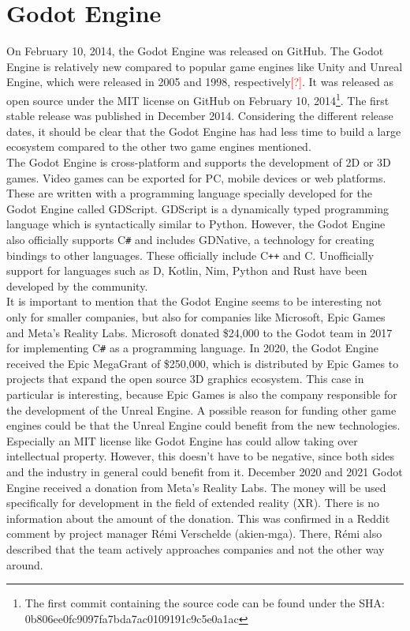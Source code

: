 \section{Godot Engine}
On February 10, 2014, the Godot Engine was released on GitHub.
The Godot Engine is relatively new compared to popular game engines like Unity and Unreal Engine, which were released in 2005 and 1998, respectively\textcolor{red}{[?]}.
It was released as open source under the MIT license on GitHub on February 10, 2014\footnote{The first commit containing the source code can be found under the SHA:\\ 0b806ee0fc9097fa7bda7ac0109191c9c5e0a1ac}\cite{godot-repository}.
The first stable release was published in December 2014\cite{godot-release}.
Considering the different release dates, it should be clear that the Godot Engine has had less time to build a large ecosystem compared to the other two game engines mentioned.\\

The Godot Engine is cross-platform and supports the development of 2D or 3D games\cite{godot-engine}.
Video games can be exported for PC, mobile devices or web platforms.
These are written with a programming language specially developed for the Godot Engine called GDScript.
GDScript is a dynamically typed programming language which is syntactically similar to Python.
However, the Godot Engine also officially supports C\texttt{\#} and includes GDNative, a technology for creating bindings to other languages\cite{godot-gdnative}.
These officially include C\texttt{++} and C.
Unofficially support for languages such as D, Kotlin, Nim, Python and Rust have been developed by the community.\\

It is important to mention that the Godot Engine seems to be interesting not only for smaller companies, but also for companies like Microsoft, Epic Games and Meta's Reality Labs.
Microsoft donated \$24,000 to the Godot team in 2017 for implementing C\texttt{\#} as a programming language\cite{godot-csharp}.
In 2020, the Godot Engine received the Epic MegaGrant of \$250,000, which is distributed by Epic Games to projects that expand the open source 3D graphics ecosystem\cite{godot-megagrant}.
This case in particular is interesting, because Epic \linebreak Games is also the company responsible for the development of the Unreal Engine.
A possible reason for funding other game engines could be that the Unreal Engine could benefit from the new technologies.
Especially an MIT license like Godot Engine has could allow taking over intellectual property.
However, this doesn't have to be negative, since both sides and the industry in general could benefit from it.
December 2020 and 2021 Godot Engine received a donation from Meta's Reality Labs\cite{godot-facebook-reality}\cite{godot-meta-reality}.
The money will be used specifically for development in the field of extended reality (XR).
There is no information about the amount of the donation.
This was confirmed in a Reddit comment by project manager Rémi Verschelde (akien-mga)\cite{reddit-companies-akien}.
There, Rémi also described that the team actively approaches companies and not the other way around.
